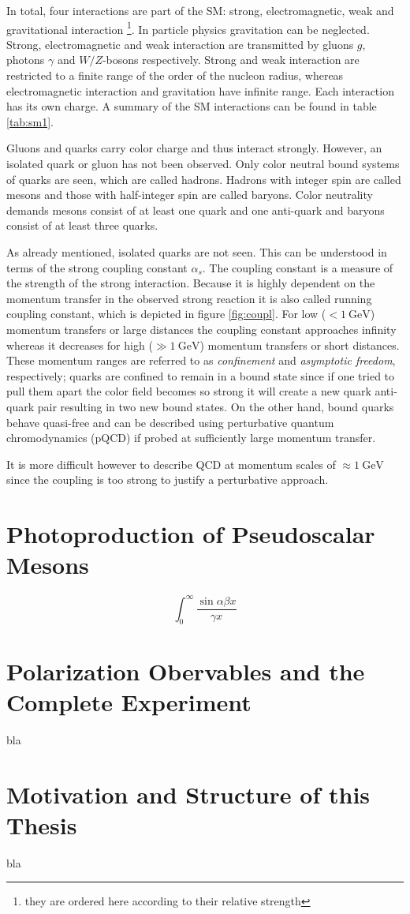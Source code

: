 In total, four interactions are part of the SM: strong, electromagnetic, weak and gravitational interaction \footnote{they are ordered here according to their relative strength}. In particle physics gravitation can be neglected. Strong, electromagnetic and weak interaction are transmitted by gluons $g$, photons $\gamma$ and $W/Z$-bosons respectively. Strong and weak interaction are restricted to a finite range of the order of the nucleon radius, whereas electromagnetic interaction and gravitation have infinite range. Each interaction has its own charge. A summary of the SM interactions can be found in table \ref{tab:sm1}. 

Gluons and quarks carry color charge and thus interact strongly. However, an isolated quark or gluon has not been observed. Only color neutral bound systems of quarks are seen, which are called hadrons. Hadrons with integer spin are called mesons and those with half-integer spin are called baryons. Color neutrality demands mesons consist of at least one quark and one anti-quark and baryons consist of at least three quarks.


 As already mentioned, isolated quarks are not seen. This can be understood in terms of the strong coupling constant $\alpha_s$. The coupling constant is a measure of the strength of the strong interaction. Because it is highly dependent on the momentum transfer in the observed strong reaction it is also called running coupling constant, which is depicted in figure \ref{fig:coupl}. For low ($<\SI{1}{\GeV}$) momentum transfers or large distances the coupling constant approaches infinity whereas it decreases for high ($\gg\SI{1}{\GeV}$) momentum transfers or short distances. These momentum ranges are referred to as \emph{confinement} and \emph{asymptotic freedom}, respectively; quarks are confined to remain in a bound state since if one tried to pull them apart the color field becomes so strong it will create a new quark anti-quark pair resulting in two new bound states. On the other hand, bound quarks behave quasi-free and can be described using perturbative quantum chromodynamics (pQCD) if probed at sufficiently large momentum transfer. 
 
 It is more difficult however to describe QCD at momentum scales of $\approx \SI{1}{\GeV}$ since the coupling is too strong to justify a perturbative approach.



 




\section{Photoproduction of Pseudoscalar Mesons}
$$\int_0^\infty\frac{\sin \alpha\beta x}{\gamma x}$$
\section{Polarization Obervables and the Complete Experiment}
bla
\section{Motivation and Structure of this Thesis}
bla